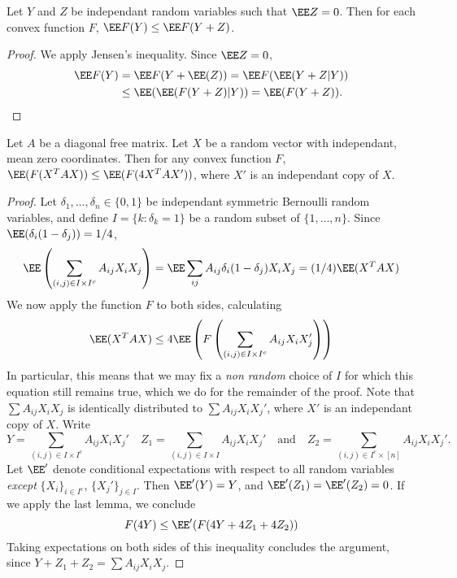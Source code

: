 \begin{lemma}
    Let $Y$ and $Z$ be independant random variables such that $\EE Z = 0$. Then for each convex function $F$, $\EE F(Y) \leq \EE F(Y+Z)$.
\end{lemma}
\begin{proof}
    We apply Jensen's inequality. Since $\EE Z = 0$,
    \begin{align*}
        \EE F(Y) &= \EE F(Y + \EE(Z)) = \EE F(\EE(Y + Z|Y))\\
        &\leq \EE(\EE(F(Y+Z)|Y)) = \EE(F(Y+Z)). \qedhere
    \end{align*}
\end{proof}

\begin{theorem}
    Let $A$ be a diagonal free matrix. Let $X$ be a random vector with independant, mean zero coordinates. Then for any convex function $F$, $\EE(F(X^T A X)) \leq \EE(F(4 X^T A X'))$, where $X'$ is an independant copy of $X$.
\end{theorem}
\begin{proof}
    Let $\delta_1, \dots, \delta_n \in \{ 0, 1 \}$ be independant symmetric Bernoulli random variables, and define $I = \{ k : \delta_k = 1 \}$ be a random subset of $\{ 1, \dots, n \}$. Since $\EE(\delta_i(1 - \delta_j)) = 1/4$,
    \[ \EE \left( \sum_{(i,j) \in I \times I^c} A_{ij} X_i X_j \right) = \EE \sum_{ij} A_{ij} \delta_i (1 - \delta_j) X_i X_j = (1/4) \EE(X^TAX) \]
    We now apply the function $F$ to both sides, calculating
    \[ \EE(X^T A X) \leq 4 \EE \left(F \left( \sum_{(i,j) \in I \times I^c} A_{ij} X_i X_j' \right) \right) \]
    In particular, this means that we may fix a {\it non random} choice of $I$ for which this equation still remains true, which we do for the remainder of the proof. Note that $\sum A_{ij} X_i X_j$ is identically distributed to $\sum A_{ij} X_i X_j'$, where $X'$ is an independant copy of $X$. Write
    \[ Y = \sum_{(i,j) \in I \times I^c} A_{ij} X_i X_j'\quad Z_1 = \sum_{(i,j) \in I \times I} A_{ij} X_i X_j'\quad \text{and}\quad Z_2 = \sum_{(i,j) \in I^c \times [n]} A_{ij} X_i X_j'. \]
    Let $\EE'$ denote conditional expectations with respect to all random variables {\it except} $\{ X_i \}_{i \in I^c}$, $\{ X_j' \}_{j \in I}$. Then $\EE'(Y) = Y$, and $\EE'(Z_1) = \EE'(Z_2) = 0$. If we apply the last lemma, we conclude
    \[ F(4Y) \leq \EE'(F(4Y + 4Z_1 + 4Z_2)) \]
    Taking expectations on both sides of this inequality concludes the argument, since $Y + Z_1 + Z_2 = \sum A_{ij} X_i X_j$.
\end{proof}

